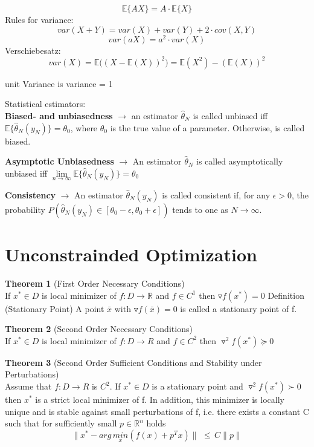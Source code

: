 \begin{equation*}
\mathbb{E }\{AX\} =A \cdot \mathbb{ E }\{X\}
\end{equation*}
Rules for variance:
\begin{equation*}
var(X+Y) = var(X)+var(Y)+2 \cdot cov(X,Y)
\end{equation*}
\begin{equation*}
var(aX) = {a}^{2} \cdot var(X)
\end{equation*}
Verschiebesatz:
\begin{equation*}
var(X)={ { \mathbb{E}((X-\mathbb{E}(X)) }^{ 2 } })=\mathbb{E}({ X }^{ 2 })-{ (\mathbb{E}(X)) }^{ 2 }
\end{equation*}

unit Variance is variance = 1

Statistical estimators:\\
\textbf{Biased- and unbiasedness} $\rightarrow$ an estimator ${\hat{\theta}}_{N}$ is called unbiased iff $\mathbb{E}\{ {\hat{\theta}}_{N} ({y}_{N})\} = \theta_0$, where ${\theta}_{0}$ is the true value of a parameter. Otherwise, is called biased.

\textbf{Asymptotic Unbiasedness} $\rightarrow$ An estimator ${\hat{\theta}}_{N}$ is called asymptotically unbiased iff 
$
\lim\limits_{n \to \infty} \mathbb{E}\{ {\hat{\theta}}_{N} ({y}_{N}) \} = \theta_0
$

\textbf{Consistency} $\rightarrow$ An estimator ${\hat{\theta}}_{N} ({y}_{N})$ is called consistent if, for any $ \epsilon > 0$, the probability $
P( {\hat{\theta}}_{N} ({y}_{N}) \in [\theta_0 - \epsilon, \theta_0 + \epsilon])
$ tends to one as $N \rightarrow \infty$.


\newpage
\section*{Unconstrainded Optimization}
\textbf{Theorem 1} (First Order Necessary Conditions)\\
If $x^* \in D$ is local minimizer of $f : D \rightarrow \mathbb{R}$ and $f \in C^1$ then
$\triangledown f (x^*) = 0$
Definition (Stationary Point) A point $\bar{x}$ with $\triangledown f(\bar{x}) = 0$ is called a stationary point of f.

\textbf{Theorem 2} (Second Order Necessary Conditions)\\
If $x^* \in D$ is local minimizer of $f : D \rightarrow R$ and $f \in C^2$ then
$\triangledown^2 f(x^*) \succeq 0$

\textbf{Theorem 3} (Second Order Sufficient Conditions and Stability under Perturbations)\\
Assume that $f : D \rightarrow R$ is $C^2.$ If $x^* \in D$ is a stationary point and
$ \triangledown^2 f(x^*) \succ 0$
then $x^*$ is a strict local minimizer of f. In addition, this minimizer is locally unique and is stable against small perturbations of f, i.e. there exists a constant C such that for sufficiently small $p \in \mathbb{R}^n$ holds\\
\begin{equation*}
\parallel{x^* - arg\, \underset{x}{min}  (f(x) + p^T x)}\parallel \,\, \leq \, C\parallel{p}\parallel
\end{equation*}



